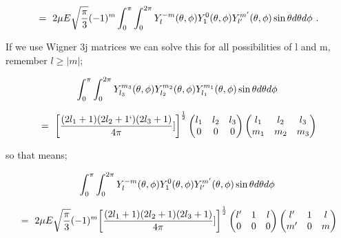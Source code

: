 \documentclass{article}
\begin{document}
\begin{equation} \label{eq:265}
= \hspace{0.125cm} 2 \mu E \sqrt{\frac{\pi}{3}} (-1)^{m} \int_{0}^{\pi} \int_{0}^{2\pi} Y_{l}^{-m}(\theta, \phi) Y_{1}^{0}(\theta, \phi) Y_{l'}^{m'}(\theta, \phi) \sin\theta d\theta d\phi \hspace{0.125cm} . 
\end{equation}

If we use Wigner 3j matrices we can solve this for all possibilities of l and m, remember \begin{math} l \ge \big| m \big| \end{math};

\begin{equation} \label{eq:262}
\int_{0}^{\pi} \int_{0}^{2\pi} Y_{l_{3}}^{m_{3}}(\theta, \phi) Y_{l_{2}}^{m_{2}}(\theta, \phi) Y_{l_{1}}^{m_{1}}(\theta, \phi) \sin\theta d\theta d\phi \hspace{0.125cm} 
\end{equation}

\begin{equation} \label{eq:263}
= \hspace{0.125cm} \bigg[\frac{(2 l_1 + 1)(2 l_2 + 1`)(2 l_3 + 1)}{4\pi}]\bigg]^{\frac{1}{2}}\begin{pmatrix} l_1 & l_2 & l_3 \\ 0 & 0 & 0 \end{pmatrix}\begin{pmatrix} l_1 & l_2 & l_3 \\ m_1 & m_2 & m_3 \end{pmatrix}
\end{equation}

so that means;

\begin{equation} \label{eq:264}
\int_{0}^{\pi} \int_{0}^{2\pi} Y_{l}^{-m}(\theta, \phi) Y_{1}^{0}(\theta, \phi) Y_{l'}^{m'}(\theta, \phi) \sin\theta d\theta d\phi \hspace{0.125cm} 
\end{equation}

\begin{equation} \label{eq:265}
= \hspace{0.125cm} 2 \mu E \sqrt{\frac{\pi}{3}} (-1)^{m} \bigg[\frac{(2 l_1 + 1)(2 l_2 + 1)(2 l_3 + 1)}{4\pi}]\bigg]^{\frac{1}{2}}\begin{pmatrix} l' & 1 & l \\ 0 & 0 & 0 \end{pmatrix}\begin{pmatrix} l' & 1 & l \\ m' & 0 & m \end{pmatrix}
\end{equation}
\end{document}

